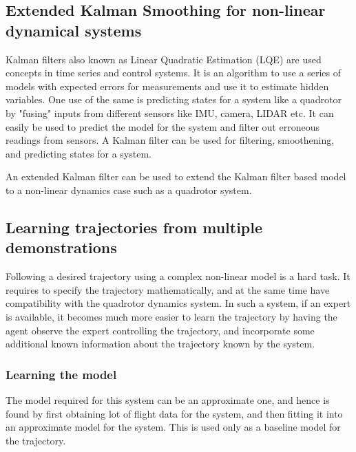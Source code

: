 \documentclass[hidelinks,BTech]{iitmdiss}
\begin{document}
\subsection*{Extended Kalman Smoothing for non-linear dynamical systems}
Kalman filters \cite{KalmanFilters} also known as Linear Quadratic Estimation (LQE) are used concepts in time series and control systems. It is an algorithm to use a series of models with expected errors for measurements and use it to estimate hidden variables. One use of the same is predicting states for a system\cite{KalmanFiltersFusion} like a quadrotor by "fusing" inputs from different sensors like IMU, camera, LIDAR etc. It can easily be used to predict the model for the system and filter out erroneous readings from sensors. A Kalman filter can be used for filtering, smoothening, and predicting states for a system.

An extended Kalman filter\cite{NonLinearEMKalman} can be used to extend the Kalman filter based model to a non-linear dynamics case such as a quadrotor system.  

\subsection{Learning trajectories from multiple demonstrations}
Following a desired trajectory using a complex non-linear model is a hard task. It requires to specify the trajectory mathematically, and at the same time have compatibility with the quadrotor dynamics system. In such a system, if an expert is available, it becomes much more easier to learn the trajectory by having the agent observe the expert controlling\cite{ApprenticeshipHelicopterAerobatics} the trajectory, and incorporate some additional known information about the trajectory known by the system.

\subsubsection {Learning the model}
The model required for this system can be an approximate one\cite{InaccurateRLmodels}, and hence is found by first obtaining lot of flight data for the system, and then fitting it into an approximate model for the system. This is used only as a baseline model for the trajectory.
\end{document}

